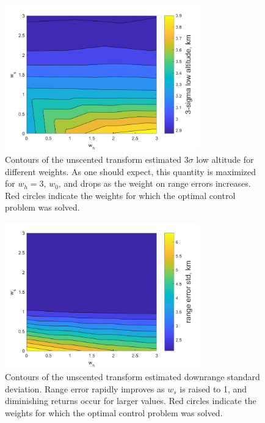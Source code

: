 \documentclass[journal ]{new-aiaa}
\begin{document}
\begin{figure}[h!]
	\centering
	\includegraphics[width=0.75\textwidth]{ddp/matlab/ClosedLoopAltitude}
	\caption{Contours of the unscented transform estimated 3$\sigma$ low altitude for different weights. As one should expect, this quantity is maximized for $w_h=3,\,w_0$, and drops as the weight on range errors increases. Red circles indicate the weights for which the optimal control problem was solved.}
	\label{fig_weight_sweep_altitude}
\end{figure}
\begin{figure}[h!]
	\centering
	\includegraphics[width=0.75\textwidth]{ddp/matlab/ClosedLoopRangeError}
	\caption{Contours of the unscented transform estimated downrange standard deviation. Range error rapidly improves as $w_s$ is raised to 1, and diminishing returns occur for larger values. Red circles indicate the weights for which the optimal control problem was solved.}
	\label{fig_weight_sweep_dr}
\end{figure}
\end{document}
